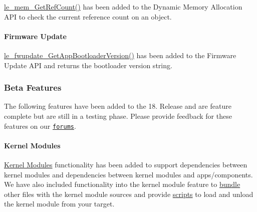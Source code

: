 \hyperlink{le__mem_8h_a4b6329068c0de997173f09cc6ed3a74d}{le\+\_\+mem\+\_\+\+Get\+Ref\+Count()} has been added to the Dynamic Memory Allocation A\+PI to check the current reference count on an object.\hypertarget{releaseNotes18051_rn1805_Features_fwupdate}{}\paragraph{Firmware Update}\label{releaseNotes18051_rn1805_Features_fwupdate}
\hyperlink{le__fwupdate__interface_8h_acb57a077943ce69791581e05d173a4a4}{le\+\_\+fwupdate\+\_\+\+Get\+App\+Bootloader\+Version()} has been added to the Firmware Update A\+PI and returns the bootloader version string.\hypertarget{releaseNotes18051_rn1805_BFeatures}{}\subsubsection{Beta Features}\label{releaseNotes18051_rn1805_BFeatures}
The following features have been added to the 18. Release and are feature complete but are still in a testing phase. Please provide feedback for these features on our \href{https://forum.legato.io/}{\tt forums}.\hypertarget{releaseNotes18051_rn1805_BFeatures_KernelModules}{}\paragraph{Kernel Modules}\label{releaseNotes18051_rn1805_BFeatures_KernelModules}
\hyperlink{conceptsKernelModule}{Kernel Modules} functionality has been added to support dependencies between kernel modules and dependencies between kernel modules and apps/components. We have also included functionality into the kernel module feature to \hyperlink{defFilesMdef_defFilesMdef_bundles}{bundle} other files with the kernel module sources and provide \hyperlink{defFilesMdef_defFilesMdef_scripts}{scripts} to load and unload the kernel module from your target.

